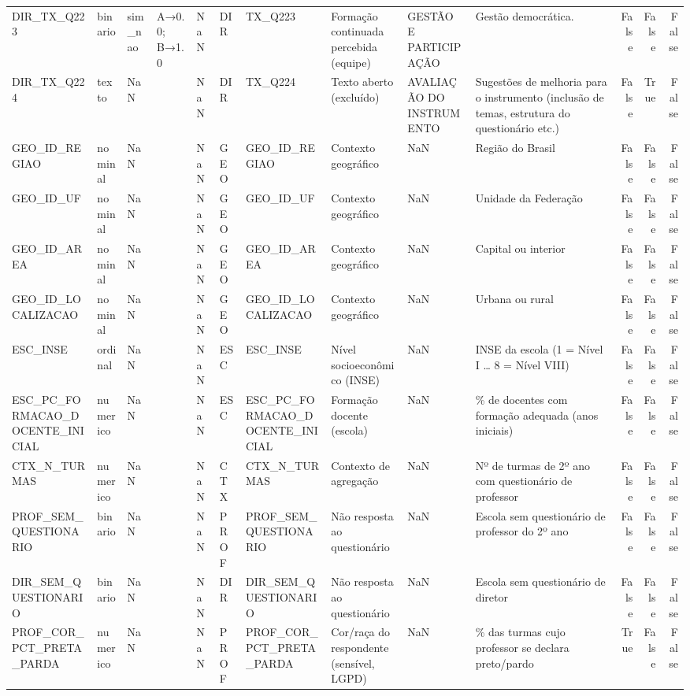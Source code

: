 \begin{tabular}{llllllllllrrr}
DIR\_TX\_Q223 & binario & sim\_nao & A→0.0; B→1.0 & NaN & DIR & TX\_Q223 & Formação continuada percebida (equipe) & GESTÃO E PARTICIPAÇÃO & Gestão democrática. & False & False & False \\
DIR\_TX\_Q224 & texto & NaN &  & NaN & DIR & TX\_Q224 & Texto aberto (excluído) & AVALIAÇÃO DO INSTRUMENTO & Sugestões de melhoria para o instrumento (inclusão de temas, estrutura do questionário etc.) & False & True & False \\
GEO\_ID\_REGIAO & nominal & NaN &  & NaN & GEO & GEO\_ID\_REGIAO & Contexto geográfico & NaN & Região do Brasil & False & False & False \\
GEO\_ID\_UF & nominal & NaN &  & NaN & GEO & GEO\_ID\_UF & Contexto geográfico & NaN & Unidade da Federação & False & False & False \\
GEO\_ID\_AREA & nominal & NaN &  & NaN & GEO & GEO\_ID\_AREA & Contexto geográfico & NaN & Capital ou interior & False & False & False \\
GEO\_ID\_LOCALIZACAO & nominal & NaN &  & NaN & GEO & GEO\_ID\_LOCALIZACAO & Contexto geográfico & NaN & Urbana ou rural & False & False & False \\
ESC\_INSE & ordinal & NaN &  & NaN & ESC & ESC\_INSE & Nível socioeconômico (INSE) & NaN & INSE da escola (1 = Nível I … 8 = Nível VIII) & False & False & False \\
ESC\_PC\_FORMACAO\_DOCENTE\_INICIAL & numerico & NaN &  & NaN & ESC & ESC\_PC\_FORMACAO\_DOCENTE\_INICIAL & Formação docente (escola) & NaN & \% de docentes com formação adequada (anos iniciais) & False & False & False \\
CTX\_N\_TURMAS & numerico & NaN &  & NaN & CTX & CTX\_N\_TURMAS & Contexto de agregação & NaN & Nº de turmas de 2º ano com questionário de professor & False & False & False \\
PROF\_SEM\_QUESTIONARIO & binario & NaN &  & NaN & PROF & PROF\_SEM\_QUESTIONARIO & Não resposta ao questionário & NaN & Escola sem questionário de professor do 2º ano & False & False & False \\
DIR\_SEM\_QUESTIONARIO & binario & NaN &  & NaN & DIR & DIR\_SEM\_QUESTIONARIO & Não resposta ao questionário & NaN & Escola sem questionário de diretor & False & False & False \\
PROF\_COR\_PCT\_PRETA\_PARDA & numerico & NaN &  & NaN & PROF & PROF\_COR\_PCT\_PRETA\_PARDA & Cor/raça do respondente (sensível, LGPD) & NaN & \% das turmas cujo professor se declara preto/pardo & True & False & False \\

\end{tabular}
